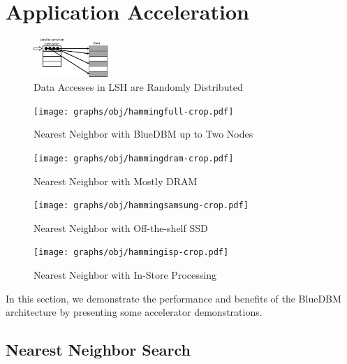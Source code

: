 
\section{Application Acceleration}
\label{sec:acceleration}
\begin{figure}[t!]
	\centering
	\includegraphics[width=0.25\textwidth]{figures/lsh-crop.pdf}
	\caption{Data Accesses in LSH are Randomly Distributed}
	\label{fig:lsh}
\end{figure}


\begin{figure}[t]
\centering
\vspace{0pt}
\begin{minipage}[c]{.2\textwidth}
	\texttt{[image: graphs/obj/hammingfull-crop.pdf]}
	\caption{Nearest Neighbor with BlueDBM up to Two Nodes}
	\label{fig:result_hammingfull}
\end{minipage}\hfill
\vspace{0pt}
\begin{minipage}[c]{.2\textwidth}
	\texttt{[image: graphs/obj/hammingdram-crop.pdf]}
	\caption{Nearest Neighbor with Mostly DRAM}
	\label{fig:result_hammingdram}
\end{minipage}\hfill
\vspace{0pt}
\begin{minipage}[c]{.2\textwidth}
	\texttt{[image: graphs/obj/hammingsamsung-crop.pdf]}
	\caption{Nearest Neighbor with Off-the-shelf SSD}
	\label{fig:result_hammingsamsung}
\end{minipage}\hfill
\vspace{0pt}
\begin{minipage}[c]{.2\textwidth}
	\texttt{[image: graphs/obj/hammingisp-crop.pdf]}
	\caption{Nearest Neighbor with In-Store Processing}
	\label{fig:result_hammingisp}
\end{minipage}
\end{figure}

In this section, we demonstrate the performance and benefits of the BlueDBM
architecture by presenting some accelerator demonstrations. 

\subsection{Nearest Neighbor Search}


